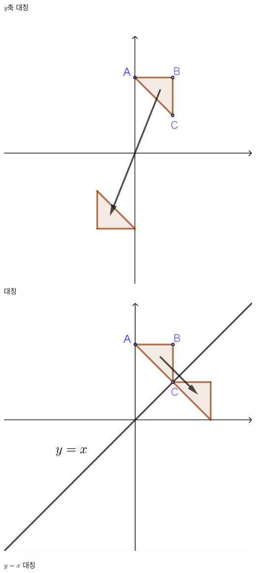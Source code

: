 \documentclass{oblivoir}
\begin{document}
\begin{center}
\begin{minipage}{.4\textwidth}
\par\(y\)축 대칭
\end{minipage}
\\[30pt]
\begin{minipage}{.4\textwidth}
\centering
\includegraphics[width=\textwidth]{rreflect_1-3}
 대칭
\end{minipage}
\qquad
\begin{minipage}{.4\textwidth}
\centering
\includegraphics[width=\textwidth]{rreflect_1-4}
\par\(y=x\) 대칭
\end{minipage}
\end{center}
\end{document}
